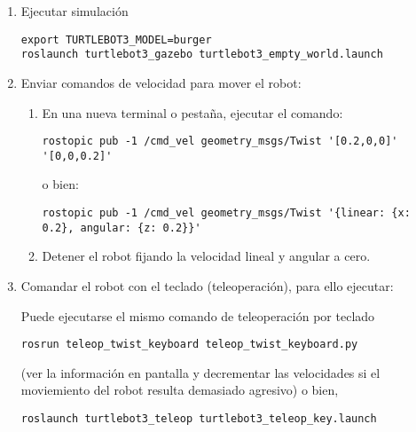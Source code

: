\documentclass[tp]{lcc}
\begin{document}
\begin{enumerate}
	\item Ejecutar simulación

\begin{lstlisting}[style=bash] 
export TURTLEBOT3_MODEL=burger
roslaunch turtlebot3_gazebo turtlebot3_empty_world.launch
\end{lstlisting}

	\item Enviar comandos de velocidad para mover el robot:

	\begin{enumerate}
	\item En una nueva terminal o pestaña, ejecutar el comando:

\begin{lstlisting}[style=bash] 
rostopic pub -1 /cmd_vel geometry_msgs/Twist '[0.2,0,0]' '[0,0,0.2]'
\end{lstlisting}
o bien:
\begin{lstlisting}[style=bash] 
rostopic pub -1 /cmd_vel geometry_msgs/Twist '{linear: {x: 0.2}, angular: {z: 0.2}}'
\end{lstlisting}

\item Detener el robot fijando la velocidad lineal y angular a cero.
	\end{enumerate}

\item Comandar el robot con el teclado (teleoperación), para ello ejecutar:

Puede ejecutarse el mismo comando de teleoperación por teclado
\begin{lstlisting}[style=bash] 
rosrun teleop_twist_keyboard teleop_twist_keyboard.py
\end{lstlisting}
(ver la información en pantalla y decrementar las velocidades si el moviemiento del robot
resulta demasiado agresivo)
o bien,
\begin{lstlisting}[style=bash] 
roslaunch turtlebot3_teleop turtlebot3_teleop_key.launch
\end{lstlisting}

\end{enumerate}
\end{document}
